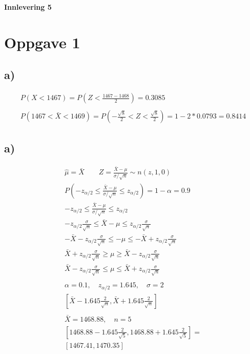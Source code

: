 \begin{center}
	\LARGE{\textbf{Innlevering 5}}
\end{center}


\section*{Oppgave 1}

\subsection*{a)}

\begin{gather*}
	P(X < 1467) = P\left(Z < \frac{1467 - 1468}{2}\right) = 0.3085
	\\
	\\
	P(1467 < \bar X < 1469) = P\left(-\frac{\sqrt{8}}{2} < Z < \frac{\sqrt{8}}{2}\right) = 1 - 2 * 0.0793 = 0.8414
\end{gather*}


\subsection*{a)}

\begin{gather*}
	\hat \mu = \bar X
	\qquad
	Z = \frac{\bar X - \mu}{\sigma / \sqrt{n}} \sim n(z, 1, 0)
	\\
	P\left(-z_{\alpha / 2} \leq \frac{\bar X - \mu}{\sigma / \sqrt{n}} \leq z_{\alpha / 2}\right) = 1 - \alpha = 0.9
	\\
	-z_{\alpha / 2} \leq \frac{\bar X - \mu}{\sigma / \sqrt{n}} \leq z_{\alpha / 2}
	\\
	-z_{\alpha / 2} \frac{\sigma}{\sqrt{n}} \leq \bar X - \mu \leq z_{\alpha / 2} \frac{\sigma}{\sqrt{n}}
	\\
	-\bar X - z_{\alpha / 2} \frac{\sigma}{\sqrt{n}} \leq -\mu \leq -\bar X + z_{\alpha / 2} \frac{\sigma}{\sqrt{n}}
	\\
	\bar X + z_{\alpha / 2} \frac{\sigma}{\sqrt{n}} \geq \mu \geq \bar X - z_{\alpha / 2} \frac{\sigma}{\sqrt{n}}
	\\
	\bar X - z_{\alpha / 2} \frac{\sigma}{\sqrt{n}} \leq \mu \leq \bar X + z_{\alpha / 2} \frac{\sigma}{\sqrt{n}}
	\\
	\\
	\alpha = 0.1, \quad z_{\alpha / 2} = 1.645, \quad \sigma = 2
	\\
	\left[\bar X - 1.645 \frac{2}{\sqrt{n}}, \bar X + 1.645 \frac{2}{\sqrt{n}}\right]
	\\
	\\
	\bar X = 1468.88, \quad n = 5
	\\
	\left[1468.88 - 1.645 \frac{2}{\sqrt{5}}, 1468.88 + 1.645 \frac{2}{\sqrt{5}}\right]
	=
	\\
	[1467.41, 1470.35]
\end{gather*}


